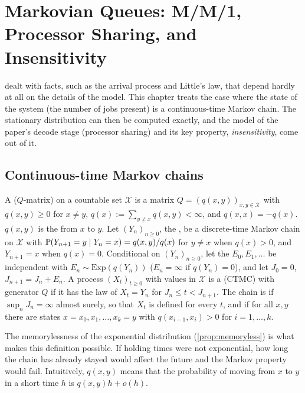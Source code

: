 \chapter{Markovian Queues: M/M/1, Processor Sharing, and Insensitivity}\label{sec:L2}

 dealt with facts, such as the arrival process and Little's law, that
depend hardly at all on the details of the model. This chapter treats the case where
the state of the system (the number of jobs present) is a continuous-time Markov
chain. The stationary distribution can then be computed exactly, and the model of the
paper's decode stage (processor sharing) and its key property, \emph{insensitivity},
come out of it.

\section{Continuous-time Markov chains}

\begin{definition}\label{def:ctmc}
A  ($Q$-matrix) on a countable set $\mathcal{X}$ is a matrix
$Q=(q(x,y))_{x,y\in\mathcal{X}}$ with $q(x,y)\ge 0$ for $x\ne y$,
$q(x):=\sum_{y\ne x}q(x,y)<\infty$, and $q(x,x)=-q(x)$.
$q(x,y)$ is the  from $x$ to $y$.
Let $(Y_n)_{n\ge0}$, the , be a discrete-time Markov chain on
$\mathcal{X}$ with $\mathbb{P}(Y_{n+1}=y\mid Y_n=x)=q(x,y)/q(x)$ for $y\ne x$ when $q(x)>0$,
and $Y_{n+1}=x$ when $q(x)=0$. Conditional on $(Y_n)_{n\ge0}$, let the  $E_0,E_1,\dots$ be independent with $E_n\sim\mathrm{Exp}(q(Y_n))$ ($E_n=\infty$
if $q(Y_n)=0$), and let $J_0=0$, $J_{n+1}=J_n+E_n$. A process $(X_t)_{t\ge0}$ with values
in $\mathcal{X}$ is a  (CTMC) with generator $Q$ if it
has the law of $X_t=Y_n$ for $J_n\le t<J_{n+1}$.
The chain is  if $\sup_nJ_n=\infty$ almost surely, so that $X_t$ is
defined for every $t$, and  if for all $x,y$ there are states
$x=x_0,x_1,\dots,x_k=y$ with $q(x_{i-1},x_i)>0$ for $i=1,\dots,k$.
\end{definition}

The memorylessness of the exponential distribution (\cref{prop:memoryless}) is what
makes this definition possible. If holding times were not exponential, how long the
chain has already stayed would affect the future and the Markov property would fail.
Intuitively, $q(x,y)$ means that the probability of moving from $x$ to $y$ in a short
time $h$ is $q(x,y)h+o(h)$.

